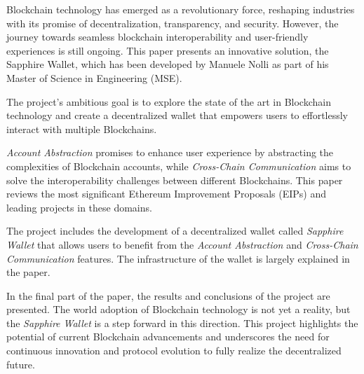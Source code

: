 \label{chap:introduction}

Blockchain technology has emerged as a revolutionary force, reshaping industries with its promise of decentralization, transparency, and security. However, the journey towards seamless blockchain interoperability and user-friendly experiences is still ongoing. This paper presents an innovative solution, the Sapphire Wallet, which has been developed by Manuele Nolli as part of his Master of Science in Engineering (MSE).

The project's ambitious goal is to explore the state of the art in Blockchain technology and create a decentralized wallet that empowers users to effortlessly interact with multiple Blockchains. 

\textit{Account Abstraction} promises to enhance user experience by abstracting the complexities of Blockchain accounts, while \textit{Cross-Chain Communication} aims to solve the interoperability challenges between different Blockchains. This paper reviews the most significant Ethereum Improvement Proposals (EIPs) and leading projects in these domains.

The project includes the development of a decentralized wallet called \textit{Sapphire Wallet} that allows users to benefit from the \textit{Account Abstraction} and \textit{Cross-Chain Communication} features. The infrastructure of the wallet is largely explained in the paper.

In the final part of the paper, the results and conclusions of the project are presented. The world adoption of Blockchain technology is not yet a reality, but the \textit{Sapphire Wallet} is a step forward in this direction. This project highlights the potential of current Blockchain advancements and underscores the need for continuous innovation and protocol evolution to fully realize the decentralized future.